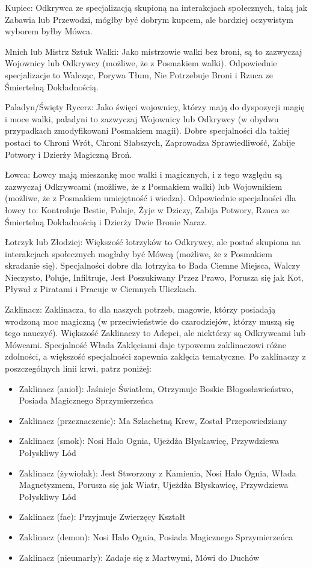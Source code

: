 Kupiec: Odkrywca ze specjalizacją skupioną na interakcjach społecznych, taką jak Zabawia lub Przewodzi, mógłby być dobrym kupcem, ale bardziej oczywistym wyborem byłby Mówca.

Mnich lub Mistrz Sztuk Walki: Jako mistrzowie walki bez broni, są to zazwyczaj Wojownicy lub Odkrywcy (możliwe, że z Posmakiem walki). Odpowiednie specjalizacje to Walcząc, Porywa Tłum, Nie Potrzebuje Broni i Rzuca ze Śmiertelną Dokładnością. 

Paladyn/Święty Rycerz: Jako święci wojownicy, którzy mają do dyspozycji magię i moce walki, paladyni to zazwyczaj Wojownicy lub Odkrywcy (w obydwu przypadkach zmodyfikowani Posmakiem magii). Dobre specjalności dla takiej postaci to Chroni Wrót, Chroni Słabszych, Zaprowadza Sprawiedliwość, Zabije Potwory i Dzierży Magiczną Broń. 

Łowca: Łowcy mają mieszankę moc walki i magicznych, i z tego względu są zazwyczaj Odkrywcami (możliwe, że z Posmakiem walki) lub Wojownikiem (możliwe, że z Posmakiem umiejętność i wiedza). Odpowiednie specjalności dla łowcy to: Kontroluje Bestie, Poluje, Żyje w Dziczy, Zabija Potwory, Rzuca ze Śmiertelną Dokładnością i Dzierży Dwie Bronie Naraz.

Łotrzyk lub Złodziej: Większość łotrzyków to Odkrywcy, ale postać skupiona na interakcjach społecznych mogłaby być Mówcą (możliwe, że z Posmakiem skradanie się). Specjalności dobre dla łotrzyka to Bada Ciemne Miejsca, Walczy Nieczysto, Poluje, Infiltruje, Jest Poszukiwany Przez Prawo, Porusza się jak Kot, Pływał z Piratami i Pracuje w Ciemnych Uliczkach.

Zaklinacz: Zaklinacza, to dla naszych potrzeb, magowie, którzy posiadają wrodzoną moc magiczną (w przeciwieństwie do czarodziejów, którzy muszą się tego nauczyć). Większość Zaklinaczy to Adepci, ale niektórzy są Odkrywcami lub Mówcami. Specjalność Włada Zaklęciami daje typowemu zaklinaczowi różne zdolności, a większość specjalności zapewnia zaklęcia tematyczne. Po zaklinaczy z poszczególnych linii krwi, patrz poniżej:

\begin{itemize}
\item Zaklinacz (anioł): Jaśnieje Światłem, Otrzymuje Boskie Błogosławieństwo, Posiada Magicznego Sprzymierzeńca
\item Zaklinacz (przeznaczenie): Ma Szlachetną Krew, Został Przepowiedziany
\item Zaklinacz (smok): Nosi Halo Ognia, Ujeżdża Błyskawicę, Przywdziewa Połyskliwy Lód
\item Zaklinacz (żywiołak): Jest Stworzony z Kamienia, Nosi Halo Ognia, Włada Magnetyzmem, Porusza się jak Wiatr, Ujeżdża Błyskawicę, Przywdziewa Połyskliwy Lód
\item Zaklinacz (fae): Przyjmuje Zwierzęcy Kształt
\item Zaklinacz (demon): Nosi Halo Ognia, Posiada Magicznego Sprzymierzeńca
\item Zaklinacz (nieumarły): Zadaje się z Martwymi, Mówi do Duchów
\end{itemize}

